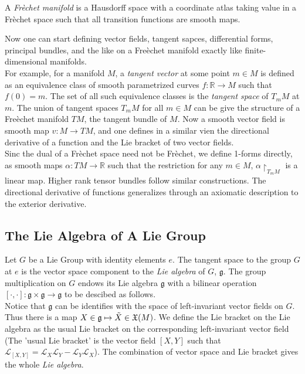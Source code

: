 \begin{defn}

A \textit{Fr\`echet manifold} is a Hausdorff space with a coordinate atlas taking value in a Fr\`echet space such that all transition functions are smooth maps.

\end{defn}



\begin{rmk}

	Now one can start defining vector fields, tangent sapces, differential forms, principal bundles, and the like on a Fre\`echet manifold exactly like finite-dimensional manifolds. \\
	\indent For example, for a manifold $M$, a \textit{tangent vector} at some point $m \in M$ is defined as an equivalence class of smooth parametrized curves $ f: \mathbb{R} \to M$ such that $f(0)=m$. The set of all such equivalence classes is the \textit{tangent space} of $T_m M$ at $m$. The union of tangent spaces $T_m M$ for all $m \in M$ can be give the structure of a Fre\`echet manifold $TM$, the tangent bundle of $M$. Now a smooth vector field is smooth map $ v: M \to TM$, and one defines in a similar vien the directional derivative of a function and the Lie bracket of two vector fields.\\ 
	\indent Sinc the dual of a Fr\`echet space need not be Fr\`echet, we define 1-forms directly, as smooth maps $ \alpha: TM \to \mathbb{R}$ such that the restriction for any $m \in M$, $\alpha \restriction_{T_m M}$ is a linear map. Higher rank tensor bundles follow similar constructions. The directional derivative of functions generalizes through an axiomatic description to the exterior derivative. 
\end{rmk}

\subsection{The Lie Algebra of A Lie Group}
\begin{defn}

	Let $G$ be a Lie Group with identity elements $e$. The tangent space to the group $G$ at $e$ is the vector space component to the \textit{Lie algebra} of $G$, $\mathfrak{g}$. The group multiplication on $G$ endows its Lie algebra $\mathfrak{g}$ with a bilinear operation $[\cdot, \cdot]: \mathfrak{g} \times \mathfrak{g} \to \mathfrak{g}$ to be descibed as follows. \\
	\indent Notice that $\mathfrak{g}$ can be identifies with the space of left-invariant vector fields on $G$. Thus there is a map $X \in \mathfrak{g} \mapsto \Tilde{X} \in \mathfrak{X}(M)$. We define the Lie bracket on the Lie algebra as the usual Lie bracket on the corresponding left-invariant vector field (The 'usual Lie bracket' is the vector field $[X,Y]$ such that $\mathcal{L}_{[X,Y]}=\mathcal{L}_X \mathcal{L}_Y - \mathcal{L}_Y \mathcal{L}_X$). The combination of vector space and Lie bracket gives the whole \textit{Lie algebra}.

\end{defn}



